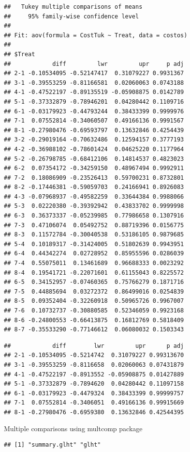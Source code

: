 \documentclass[
  11pt,
]{article}
\begin{document}
\begin{verbatim}
##   Tukey multiple comparisons of means
##     95% family-wise confidence level
## 
## Fit: aov(formula = CostTuk ~ Treat, data = costos)
## 
## $Treat
##            diff         lwr         upr     p adj
## 2-1 -0.10534095 -0.52147417  0.31079227 0.9931367
## 3-1 -0.39553259 -0.81166581  0.02060063 0.0743188
## 4-1 -0.47522197 -0.89135519 -0.05908875 0.0142789
## 5-1 -0.37332879 -0.78946201  0.04280442 0.1109716
## 6-1 -0.03179923 -0.44793244  0.38433399 0.9999976
## 7-1  0.07552814 -0.34060507  0.49166136 0.9991567
## 8-1 -0.27980476 -0.69593797  0.13632846 0.4254439
## 3-2 -0.29019164 -0.70632486  0.12594157 0.3777193
## 4-2 -0.36988102 -0.78601424  0.04625220 0.1177964
## 5-2 -0.26798785 -0.68412106  0.14814537 0.4823023
## 6-2  0.07354172 -0.34259150  0.48967494 0.9992911
## 7-2  0.18086909 -0.23526413  0.59700231 0.8732801
## 8-2 -0.17446381 -0.59059703  0.24166941 0.8926083
## 4-3 -0.07968937 -0.49582259  0.33644384 0.9988066
## 5-3  0.02220380 -0.39392942  0.43833702 0.9999998
## 6-3  0.36373337 -0.05239985  0.77986658 0.1307916
## 7-3  0.47106074  0.05492752  0.88719396 0.0156775
## 8-3  0.11572784 -0.30040538  0.53186105 0.9879685
## 5-4  0.10189317 -0.31424005  0.51802639 0.9943951
## 6-4  0.44342274  0.02728952  0.85955596 0.0286039
## 7-4  0.55075011  0.13461689  0.96688333 0.0023292
## 8-4  0.19541721 -0.22071601  0.61155043 0.8225572
## 6-5  0.34152957 -0.07460365  0.75766279 0.1871716
## 7-5  0.44885694  0.03272372  0.86499016 0.0254839
## 8-5  0.09352404 -0.32260918  0.50965726 0.9967007
## 7-6  0.10732737 -0.30880585  0.52346059 0.9923168
## 8-6 -0.24800553 -0.66413875  0.16812769 0.5818409
## 8-7 -0.35533290 -0.77146612  0.06080032 0.1503343
\end{verbatim}

\begin{verbatim}
##            diff        lwr         upr      p adj
## 2-1 -0.10534095 -0.5214742  0.31079227 0.99313670
## 3-1 -0.39553259 -0.8116658  0.02060063 0.07431879
## 4-1 -0.47522197 -0.8913552 -0.05908875 0.01427889
## 5-1 -0.37332879 -0.7894620  0.04280442 0.11097158
## 6-1 -0.03179923 -0.4479324  0.38433399 0.99999757
## 7-1  0.07552814 -0.3406051  0.49166136 0.99915669
## 8-1 -0.27980476 -0.6959380  0.13632846 0.42544395
\end{verbatim}

Multiple comparisons using multcomp package

\begin{verbatim}
## [1] "summary.glht" "glht"
\end{verbatim}
\end{document}
